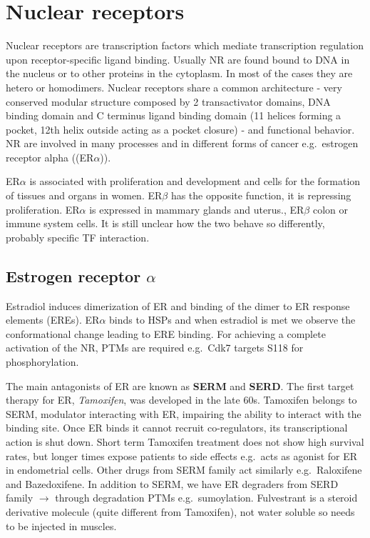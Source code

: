 \hypertarget{nuclear-receptors}{%
\section{Nuclear receptors}\label{nuclear-receptors}}

Nuclear receptors are transcription factors which mediate transcription regulation upon receptor-specific ligand binding. Usually NR are found bound to DNA in the nucleus or to other proteins in the cytoplasm. In most of the cases they are hetero or homodimers. Nuclear receptors share a common architecture - very conserved modular structure composed by 2 transactivator domains, DNA binding domain and C terminus ligand binding domain (11 helices forming a pocket, 12th helix outside acting as a pocket closure) - and functional behavior. NR are involved in many processes and in different forms of cancer e.g.~estrogen receptor alpha ((ER$\alpha$)).

ER$\alpha$ is associated with proliferation and development and cells for the formation of tissues and organs in women. ER$\beta$ has the opposite function, it is repressing proliferation. ER$\alpha$ is expressed in mammary glands and uterus., ER$\beta$ colon or immune system cells. It is still unclear how the two behave so differently, probably specific TF interaction.

\hypertarget{estrogen-receptor-alpha}{%
\subsection{\texorpdfstring{Estrogen receptor \(\alpha\)}{Estrogen receptor \textbackslash alpha}}\label{estrogen-receptor-alpha}}

Estradiol induces dimerization of ER and binding of the dimer to ER response elements (EREs). ER$\alpha$ binds to HSPs and when estradiol is met we observe the conformational change leading to ERE binding. For achieving a complete activation of the NR, PTMs are required e.g.~Cdk7 targets S118 for phosphorylation.

The main antagonists of ER are known as \textbf{SERM} and \textbf{SERD}. The first target therapy for ER, \emph{Tamoxifen}, was developed in the late 60s. Tamoxifen belongs to SERM, modulator interacting with ER, impairing the ability to interact with the binding site. Once ER binds it cannot recruit co-regulators, its transcriptional action is shut down. Short term Tamoxifen treatment does not show high survival rates, but longer times expose patients to side effects e.g.~acts as agonist for ER in endometrial cells. Other drugs from SERM family act similarly e.g.~Raloxifene and Bazedoxifene. In addition to SERM, we have ER degraders from SERD family $\rightarrow$ through degradation PTMs e.g.~sumoylation. Fulvestrant is a steroid derivative molecule (quite different from Tamoxifen), not water soluble so needs to be injected in muscles.

